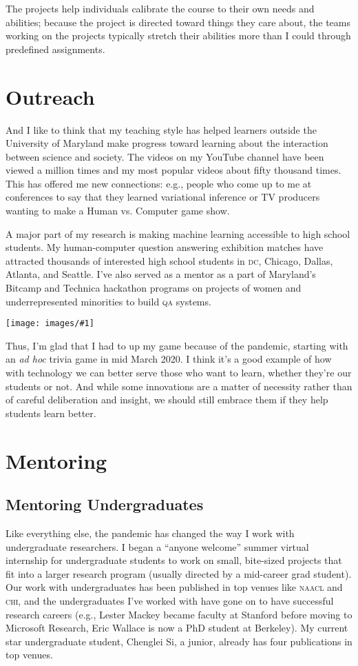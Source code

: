 \documentclass[11pt]{amsart}
\newcommand{\abr}[1]{\textsc{#1}}
\newcommand{\image}[2]{  \begin{center}
\texttt{[image: images/\#1]}
\end{center}
  }
\begin{document}
The projects help individuals calibrate the course to their own needs
and abilities; because the project is directed toward things they care
about, the teams working on the projects typically stretch their
abilities more than I could through predefined assignments.

\section{Outreach}

And I like to think that my teaching style has helped learners outside
the University of Maryland make progress toward learning about the
interaction between science and society.  The videos on my YouTube
channel have been viewed a million times and my most popular videos
about fifty thousand times.  This has offered me new connections:
e.g., people who come up to me at conferences to say that they learned
variational inference or TV producers wanting to make a Human
vs. Computer game show.

A major part of my research is making machine learning accessible to
high school students.
%
My human-computer question answering exhibition matches have attracted
thousands of interested high school students in \abr{dc}, Chicago,
Dallas, Atlanta, and Seattle.
%
I've also served as a mentor as a part of Maryland's Bitcamp and
Technica hackathon programs on projects of women and underrepresented
minorities to build \abr{qa} systems.

\image{atlanta_hsnct}{}

Thus, I'm glad that I had to up my game because of the pandemic,
starting with an \textit{ad hoc} trivia game in mid March 2020.  I
think it's a good example of how with technology we can better serve
those who want to learn, whether they're our students or not.  And
while some innovations are a matter of necessity rather than of
careful deliberation and insight, we should still embrace them if they
help students learn better.

\section{Mentoring}

\subsection{Mentoring Undergraduates}

Like everything else, the pandemic has changed the way I work with
undergraduate researchers.
%
I began a ``anyone welcome'' summer virtual internship for
undergraduate students to work on small, bite-sized projects that fit
into a larger research program (usually directed by a mid-career grad
student).
%
Our work with undergraduates has been published in top venues like
\abr{naacl} and \abr{chi}, and the undergraduates I've worked with
have gone on to have successful research careers (e.g., Lester Mackey
became faculty at Stanford before moving to Microsoft Research, Eric
Wallace is now a PhD student at Berkeley).
%
My current star undergraduate student, Chenglei Si, a junior, already
has four publications in top venues.
\end{document}
